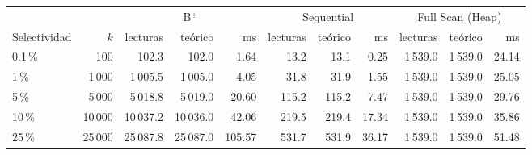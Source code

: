 \begin{tabular}{@{}lrrrrrrrrrr@{}}
\toprule
 & & \multicolumn{3}{c}{B$^+$} & \multicolumn{3}{c}{Sequential} & \multicolumn{3}{c}{Full Scan (Heap)} \\
\cmidrule(lr){3-5}\cmidrule(lr){6-8}\cmidrule(lr){9-11}
Selectividad & $k$ & lecturas & teórico & ms & lecturas & teórico & ms & lecturas & teórico & ms \\
\midrule
0.1\,\% & 100 & 102.3 & 102.0 & 1.64 & 13.2 & 13.1 & 0.25 & 1\,539.0 & 1\,539.0 & 24.14 \\
1\,\% & 1\,000 & 1\,005.5 & 1\,005.0 & 4.05 & 31.8 & 31.9 & 1.55 & 1\,539.0 & 1\,539.0 & 25.05 \\
5\,\% & 5\,000 & 5\,018.8 & 5\,019.0 & 20.60 & 115.2 & 115.2 & 7.47 & 1\,539.0 & 1\,539.0 & 29.76 \\
10\,\% & 10\,000 & 10\,037.2 & 10\,036.0 & 42.06 & 219.5 & 219.4 & 17.34 & 1\,539.0 & 1\,539.0 & 35.86 \\
25\,\% & 25\,000 & 25\,087.8 & 25\,087.0 & 105.57 & 531.7 & 531.9 & 36.17 & 1\,539.0 & 1\,539.0 & 51.48 \\
\bottomrule
\end{tabular}
